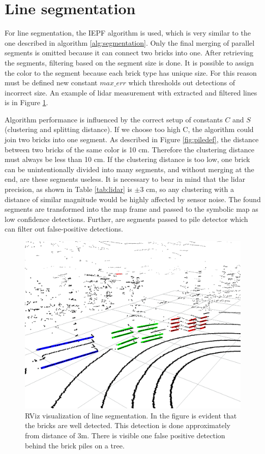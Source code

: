 \section{Line segmentation}
For line segmentation, the IEPF algorithm is used, which is very similar to the one described in algorithm \ref{alg:segmentation}. Only the final merging of parallel segments is omitted because it can connect two bricks into one. After retrieving the segments, filtering based on the segment size is done. It is possible to assign the color to the segment because each brick type has unique size. For this reason must be defined new constant $max\_err$ which thresholds out detections of incorrect size. An example of lidar measurement with extracted and filtered lines is in Figure \ref{fig:segments}. 

Algorithm performance is influenced by the correct setup of constants $C$ and $S$ (clustering and splitting distance). If we choose too high C, the algorithm could join two bricks into one segment. As described in Figure \ref{fig:piledef}, the distance between two bricks of the same color is 10 cm. Therefore the clustering distance must always be less than 10 cm. If the clustering distance is too low, one brick can be unintentionally divided into many segments, and without merging at the end, are these segments useless. It is necessary to bear in mind that the lidar precision, as shown in Table \ref{tab:lidar} is $\pm3$ cm, so any clustering with a distance of similar magnitude would be highly affected by sensor noise. The found segments are transformed into the map frame and passed to the symbolic map as low confidence detections. Further, are segments passed to pile detector which can filter out false-positive detections.

\hspace{8mm}

\begin{figure}[H]
\centering
\includegraphics[scale=0.43]{fig/segments}
\caption[Line segmentation visualization]{RViz visualization of line segmentation. In the figure is evident that the bricks are well detected. This detection is done approximately from distance of $3$m. There is visible one false positive detection behind the brick piles on a tree.}
\label{fig:segments}
\end{figure}



